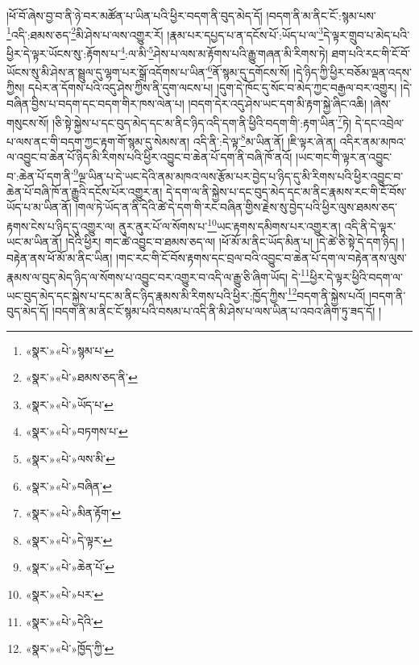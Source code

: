 །ཕོ་བོ་ཞེས་བྱ་བ་ནི་ཉེ་བར་མཚོན་པ་ཡིན་པའི་ཕྱིར་བདག་ནི་བུད་མེད་དོ། །བདག་ནི་མ་ནིང་ངོ་:སྙམ་པས་\footnote{«སྣར་»«པེ་»སྙམ་པ་}འདི་:ཐམས་ཅད་\footnote{«སྣར་»«པེ་»ཐམས་ཅད་ནི་}མི་ཤེས་པ་ལས་འགྱུར་རོ། །རྣམ་པར་དཔྱད་པ་ན་དངོས་པོ་:ཡོད་པ་ལ་\footnote{«སྣར་»«པེ་»ཡོད་པ་}དེ་ལྟར་གྲུབ་པ་མེད་པའི་ཕྱིར་དེ་ལྟར་ཡོངས་སུ་:རྟོགས་པ་\footnote{«སྣར་»«པེ་»བཏགས་པ་}:ལ་མི་\footnote{«སྣར་»«པེ་»ལས་མི་}ཤེས་པ་ལས་མ་རྟོགས་པའི་རྒྱུ་གཞན་མི་རིགས་ཏེ། ཐག་པའི་རང་གི་ངོ་བོ་ཡོངས་སུ་མི་ཤེས་ན་སྦྲུལ་དུ་ལྷག་པར་སྒྲོ་འདོགས་པ་ཡིན་\footnote{«སྣར་»«པེ་»བཞིན་}ནོ་སྙམ་དུ་དགོངས་སོ། །དེ་ཉིད་ཀྱི་ཕྱིར་བཅོམ་ལྡན་འདས་ཀྱིས། དཔེར་ན་དོགས་པའི་འདུ་ཤེས་ཀྱིས་ནི་དུག་ལངས་པ། །དུག་དེ་ཁོང་དུ་སོང་བ་མེད་ཀྱང་བརྒྱལ་བར་འགྱུར། །དེ་བཞིན་བྱིས་པ་བདག་དང་བདག་གིར་ཁས་ལེན་པ། །བདག་དེར་འདུ་ཤེས་ཡང་དག་མི་རྟག་སྐྱེ་ཞིང་འཆི། །ཞེས་གསུངས་སོ། །ཅི་སྟེ་སྐྱེས་པ་དང་བུད་མེད་དང་མ་ནིང་ཉིད་འདི་དག་ནི་ཕྱིའི་བདག་གི་:རྟག་ཡིན་\footnote{«སྣར་»«པེ་»མིན་རྟོག་}ཏེ། དེ་དང་འབྲེལ་པ་ལས་ནང་གི་བདག་ཀྱང་རྟག་གོ་སྙམ་དུ་སེམས་ན། འདི་ནི་:དེ་ལྟ་\footnote{«སྣར་»«པེ་»དེ་ལྟར་}མ་ཡིན་ནོ། །ཇི་ལྟར་ཞེ་ན། འདིར་ནམ་མཁའ་ལ་འབྱུང་བ་ཆེན་པོ་ཉིད་མི་རིགས་པའི་ཕྱིར་འབྱུང་བ་ཆེན་པོ་དག་ནི་བཞི་ཁོ་ནའོ། །ཡང་གང་གི་ལྟར་ན་འབྱུང་བ་:ཆེན་པོ་དག་ནི་\footnote{«སྣར་»«པེ་»ཆེན་པོ་}ལྔ་ཡིན་པ་དེ་ཡང་དེའི་ནམ་མཁའ་ལས་རྩོམ་པར་བྱེད་པ་ཉིད་དུ་མི་རིགས་པའི་ཕྱིར་འབྱུང་བ་ཆེན་པོ་བཞི་ཁོ་ན་རྒྱུའི་དངོས་པོར་འགྱུར་ན། དེ་དག་ལ་ནི་སྐྱེས་པ་དང་བུད་མེད་དང་མ་ནིང་རྣམས་རང་གི་ངོ་བོས་ཡོད་པ་མ་ཡིན་ནོ། །གལ་ཏེ་ཡོད་ན་ནི་དེའི་ཚེ་དེ་དག་གི་རང་བཞིན་གྱིས་རྗེས་སུ་བྱེད་པའི་ཕྱིར་ལུས་ཐམས་ཅད་རྟགས་ངེས་པ་ཉིད་དུ་འགྱུར་ལ། ནུར་ནུར་པོ་ལ་སོགས་པ་\footnote{«སྣར་»«པེ་»པར་}ཡང་རྟགས་དམིགས་པར་འགྱུར་ན། འདི་ནི་དེ་ལྟར་ཡང་མ་ཡིན་ནོ། །དེའི་ཕྱིར། གང་ཚེ་འབྱུང་བ་ཐམས་ཅད་ལ། །ཕོ་མོ་མ་ནིང་ཡོད་མིན་པ། །དེ་ཚེ་ཅི་སྟེ་དེ་དག་ཉིད། །བརྟེན་ནས་ཕོ་མོ་མ་ནིང་ཡིན། །གང་རང་གི་ངོ་བོས་རྟགས་དང་བྲལ་བའི་འབྱུང་བ་ཆེན་པོ་དག་ལ་བརྟེན་ནས་ལུས་རྣམས་ལ་བུད་མེད་ཉིད་ལ་སོགས་པ་འབྱུང་བར་འགྱུར་བ་འདི་ལ་རྒྱུ་ཅི་ཞིག་ཡོད། དེ་\footnote{«སྣར་»«པེ་»དེའི་}ཕྱིར་དེ་ལྟར་ཕྱིའི་བདག་ལ་ཡང་བུད་མེད་དང་སྐྱེས་པ་དང་མ་ནིང་ཉིད་རྣམས་མི་རིགས་པའི་ཕྱིར་:ཁྱོད་ཀྱིས་\footnote{«སྣར་»«པེ་»ཁྱོད་ཀྱི་}བདག་ནི་སྐྱེས་པའོ། །བདག་ནི་བུད་མེད་དོ། །བདག་ནི་མ་ནིང་ངོ་སྙམ་པའི་བསམ་པ་འདི་ནི་མི་ཤེས་པ་ལས་ཡིན་པ་འབའ་ཞིག་ཏུ་ཟད་དོ། །

